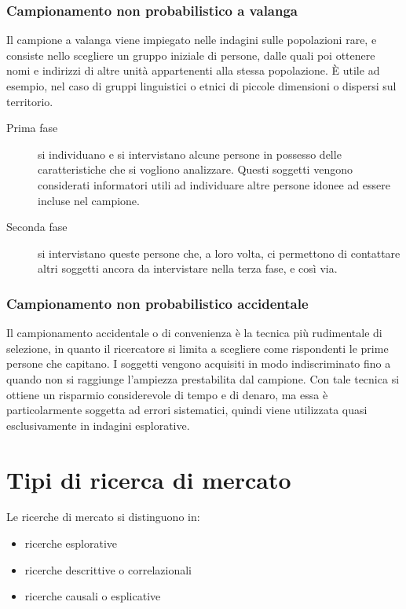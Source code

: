 \subsubsection{Campionamento non probabilistico a valanga}
Il campione a valanga viene impiegato nelle indagini sulle popolazioni rare, e consiste nello scegliere un gruppo iniziale di persone, dalle quali poi ottenere nomi e indirizzi di altre unità appartenenti alla stessa popolazione. È utile ad esempio, nel caso di gruppi linguistici o etnici di piccole dimensioni o dispersi sul territorio.
\begin{description}
	\item[Prima fase] si individuano e si intervistano alcune persone in possesso delle caratteristiche che si vogliono analizzare. Questi soggetti vengono considerati informatori utili ad individuare altre persone idonee ad essere incluse nel campione.
	\item[Seconda fase] si intervistano queste persone che, a loro volta, ci permettono di contattare altri soggetti ancora da intervistare nella terza fase, e così via.
\end{description}

\subsubsection{Campionamento non probabilistico accidentale}
Il campionamento accidentale o di convenienza è la tecnica più rudimentale di selezione, in quanto il ricercatore si limita a scegliere come rispondenti le prime persone che capitano. I soggetti vengono acquisiti in modo indiscriminato fino a quando non si raggiunge l’ampiezza prestabilita dal campione. Con tale tecnica si ottiene un risparmio considerevole di tempo e di denaro, ma essa è particolarmente soggetta ad errori sistematici, quindi viene utilizzata quasi esclusivamente in indagini esplorative.

\section{Tipi di ricerca di mercato}
Le ricerche di mercato si distinguono in:
\begin{itemize}
	\item ricerche esplorative
	\item ricerche descrittive o correlazionali
	\item ricerche causali o esplicative
\end{itemize}

